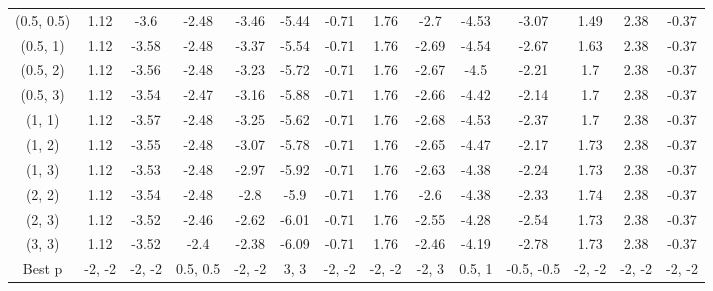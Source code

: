 \documentclass[11pt,a4paper,twoside,openany]{book}\usepackage{knitr}
\begin{document}
{{\begin{knitrout}
\begin{landscape}
\begin{longtable}[t]{cccccccccccccc}
(0.5, 0.5) & 1.12 & -3.6 & -2.48 & -3.46 & -5.44 & -0.71 & 1.76 & -2.7 & -4.53 & -3.07 & 1.49 & 2.38 & -0.37\\
(0.5, 1) & 1.12 & -3.58 & -2.48 & -3.37 & -5.54 & -0.71 & 1.76 & -2.69 & -4.54 & -2.67 & 1.63 & 2.38 & -0.37\\
(0.5, 2) & 1.12 & -3.56 & -2.48 & -3.23 & -5.72 & -0.71 & 1.76 & -2.67 & -4.5 & -2.21 & 1.7 & 2.38 & -0.37\\
(0.5, 3) & 1.12 & -3.54 & -2.47 & -3.16 & -5.88 & -0.71 & 1.76 & -2.66 & -4.42 & -2.14 & 1.7 & 2.38 & -0.37\\
(1, 1) & 1.12 & -3.57 & -2.48 & -3.25 & -5.62 & -0.71 & 1.76 & -2.68 & -4.53 & -2.37 & 1.7 & 2.38 & -0.37\\
(1, 2) & 1.12 & -3.55 & -2.48 & -3.07 & -5.78 & -0.71 & 1.76 & -2.65 & -4.47 & -2.17 & 1.73 & 2.38 & -0.37\\
(1, 3) & 1.12 & -3.53 & -2.48 & -2.97 & -5.92 & -0.71 & 1.76 & -2.63 & -4.38 & -2.24 & 1.73 & 2.38 & -0.37\\
(2, 2) & 1.12 & -3.54 & -2.48 & -2.8 & -5.9 & -0.71 & 1.76 & -2.6 & -4.38 & -2.33 & 1.74 & 2.38 & -0.37\\
(2, 3) & 1.12 & -3.52 & -2.46 & -2.62 & -6.01 & -0.71 & 1.76 & -2.55 & -4.28 & -2.54 & 1.73 & 2.38 & -0.37\\
(3, 3) & 1.12 & -3.52 & -2.4 & -2.38 & -6.09 & -0.71 & 1.76 & -2.46 & -4.19 & -2.78 & 1.73 & 2.38 & -0.37\\
Best p & -2, -2 & -2, -2 & 0.5, 0.5 & -2, -2 & 3, 3 & -2, -2 & -2, -2 & -2, 3 & 0.5, 1 & -0.5, -0.5 & -2, -2 & -2, -2 & -2, -2\\*
\end{longtable}
\end{landscape}


\end{knitrout}


\begin{table}[!h]


\end{table}}}
\end{document}
